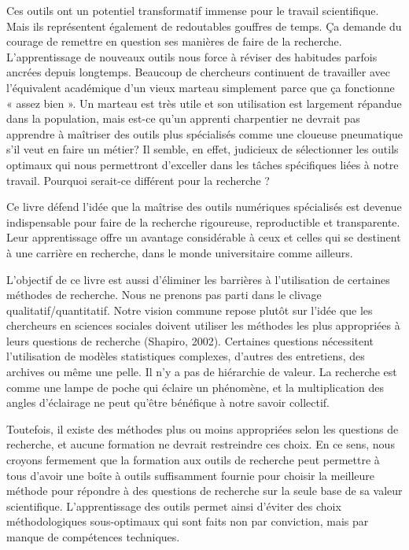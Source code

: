 \documentclass[
  letterpaper,
  DIV=11,
  numbers=noendperiod,
  oneside]{scrreprt}
\begin{document}
Ces outils ont un potentiel transformatif immense pour le travail
scientifique. Mais ils représentent également de redoutables gouffres de
temps. Ça demande du courage de remettre en question ses manières de
faire de la recherche. L'apprentissage de nouveaux outils nous force à
réviser des habitudes parfois ancrées depuis longtemps. Beaucoup de
chercheurs continuent de travailler avec l'équivalent académique d'un
vieux marteau simplement parce que ça fonctionne « assez bien ». Un
marteau est très utile et son utilisation est largement répandue dans la
population, mais est-ce qu'un apprenti charpentier ne devrait pas
apprendre à maîtriser des outils plus spécialisés comme une cloueuse
pneumatique s'il veut en faire un métier? Il semble, en effet, judicieux
de sélectionner les outils optimaux qui nous permettront d'exceller dans
les tâches spécifiques liées à notre travail. Pourquoi serait-ce
différent pour la recherche ?

Ce livre défend l'idée que la maîtrise des outils numériques spécialisés
est devenue indispensable pour faire de la recherche rigoureuse,
reproductible et transparente. Leur apprentissage offre un avantage
considérable à ceux et celles qui se destinent à une carrière en
recherche, dans le monde universitaire comme ailleurs.

L'objectif de ce livre est aussi d'éliminer les barrières à
l'utilisation de certaines méthodes de recherche. Nous ne prenons pas
parti dans le clivage qualitatif/quantitatif. Notre vision commune
repose plutôt sur l'idée que les chercheurs en sciences sociales doivent
utiliser les méthodes les plus appropriées à leurs questions de
recherche (Shapiro, 2002). Certaines questions nécessitent l'utilisation
de modèles statistiques complexes, d'autres des entretiens, des archives
ou même une pelle. Il n'y a pas de hiérarchie de valeur. La recherche
est comme une lampe de poche qui éclaire un phénomène, et la
multiplication des angles d'éclairage ne peut qu'être bénéfique à notre
savoir collectif.

Toutefois, il existe des méthodes plus ou moins appropriées selon les
questions de recherche, et aucune formation ne devrait restreindre ces
choix. En ce sens, nous croyons fermement que la formation aux outils de
recherche peut permettre à tous d'avoir une boîte à outils suffisamment
fournie pour choisir la meilleure méthode pour répondre à des questions
de recherche sur la seule base de sa valeur scientifique.
L'apprentissage des outils permet ainsi d'éviter des choix
méthodologiques sous-optimaux qui sont faits non par conviction, mais
par manque de compétences techniques.
\end{document}
